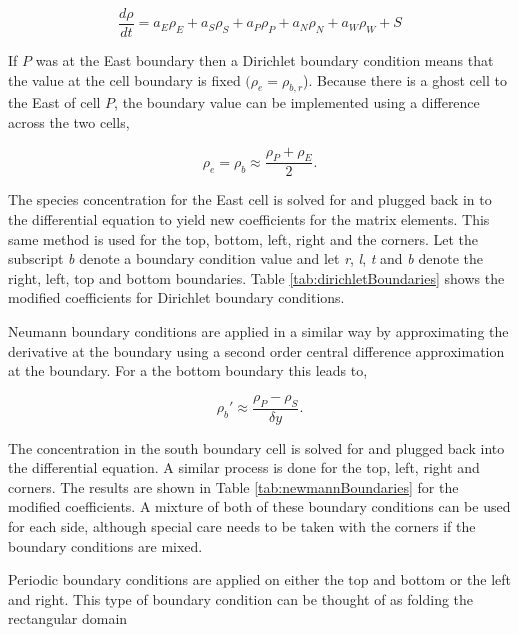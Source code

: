 \begin{equation}
    \frac{d\rho}{dt} = a_{E}\rho_{E} + a_{S}\rho_{S} + a_{P}\rho_{P} + a_{N}\rho_{N} + a_{W}\rho_{W} + S
\end{equation}

\noindent If $P$ was at the East boundary then a Dirichlet boundary condition means that the value at the cell boundary is fixed $(\rho_{e} = \rho_{b,r}$). Because there is a ghost cell to the East of cell $P$, the boundary value can be implemented using a difference across the two cells,

\begin{equation}
    \rho_{e} = \rho_{b} \approx \frac{\rho_{P} + \rho_{E}}{2}.
\end{equation}

\noindent The species concentration for the East cell is solved for and plugged back in to the differential equation to yield new coefficients for the matrix elements. This same method is used for the top, bottom, left, right and the corners. Let the subscript \textit{b} denote a boundary condition value and let \textit{r}, \textit{l}, \textit{t} and \textit{b} denote the right, left, top and bottom boundaries. Table \ref{tab:dirichletBoundaries} shows the modified coefficients for Dirichlet boundary conditions. 

Neumann boundary conditions are applied in a similar way by approximating the derivative at the boundary using a second order central difference approximation at the boundary. For a the bottom boundary this leads to,

\begin{equation}
    \rho_{b}' \approx \frac{\rho_{P} - \rho_{S}}{\delta y}.
\end{equation}

\noindent The concentration in the south boundary cell is solved for and plugged back into the differential equation. A similar process is done for the top, left, right and corners. The results are shown in Table \ref{tab:newmannBoundaries} for the modified coefficients. A mixture of both of these boundary conditions can be used for each side, although special care needs to be taken with the corners if the boundary conditions are mixed. 

Periodic boundary conditions are applied on either the top and bottom or the left and right. This type of boundary condition can be thought of as folding the rectangular domain 

\clearpage

